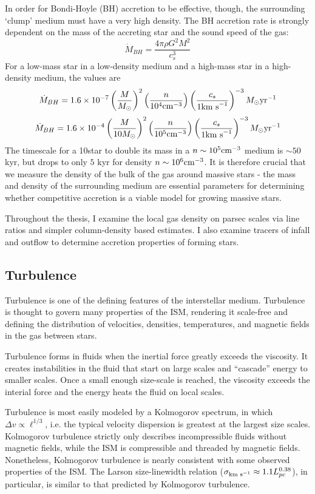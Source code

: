 In order for Bondi-Hoyle (BH) accretion to be effective, though, the surrounding `clump'
medium must have a very high density.  The BH accretion rate is strongly dependent on the 
mass of the accreting star and the sound speed of the gas:
$$\dot{M}_{BH} = \frac{4 \pi \rho G^2 M^2}{c_s^3} $$
For a low-mass star in a low-density medium and a high-mass star in a high-density medium,
the values are
$$\dot{M}_{BH} = 1.6\times10^{-7} \left(\frac{M}{M_\odot}\right)^2 \left(\frac{n}{10^4 \text{cm}^{-3}}\right) \left(\frac{c_s}{1 \text{km s}^{-1}}\right)^{-3} M_{\odot} \textrm{yr}^{-1}$$
$$\dot{M}_{BH} = 1.6\times10^{-4} \left(\frac{M}{10 M_\odot}\right)^2 \left(\frac{n}{10^5 \text{cm}^{-3}}\right) \left(\frac{c_s}{1 \text{km s}^{-1}}\right)^{-3} M_{\odot} \textrm{yr}^{-1}$$
The timescale for a 10\msun star to double its mass in a $n\sim10^5\textrm{cm}^{-3}$
medium is $\sim50$ kyr, but drops to only $5$ kyr for density
$n\sim10^6\textrm{cm}^{-3}$.  
It is therefore crucial that we measure the density of the bulk of the gas
around massive stars - the mass and density of the surrounding medium are
essential parameters for determining whether competitive accretion is a viable
model for growing massive stars.

Throughout the thesis, I examine the local gas density on parsec scales via
line ratios and simpler column-density based estimates.  I also examine tracers
of infall and outflow to determine accretion properties of forming stars.

\subsection{Turbulence}
Turbulence is one of the defining features of the interstellar medium.
Turbulence is thought to govern many properties of the ISM, rendering it
scale-free and defining the distribution of velocities, densities,
temperatures, and magnetic fields in the gas between stars.

Turbulence forms in fluids when the inertial force greatly exceeds the
viscosity.  It creates instabilities in the fluid that start on large scales
and ``cascade'' energy to smaller scales.  Once a small enough size-scale is
reached, the viscosity exceeds the interial force and the energy heats the
fluid on local scales.

Turbulence is most easily modeled by a Kolmogorov spectrum, in which $\Delta v
\propto \ell^{1/3}$, i.e. the typical velocity dispersion is greatest at the
largest size scales.  Kolmogorov turbulence strictly only describes
incompressible fluids without magnetic fields, while the ISM is compressible
and threaded by magnetic fields.  Nonetheless, Kolmogorov turbulence is nearly
consistent with some observed properties of the ISM.  The Larson size-linewidth
relation ($\sigma_{\textrm{km~s}^{-1}}\approx1.1 L_{pc}^{0.38}$), in particular, is similar
to that predicted by Kolmogorov turbulence.

